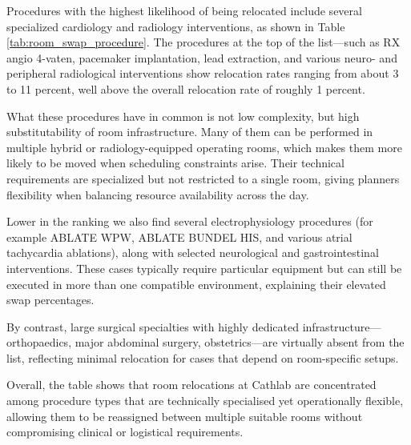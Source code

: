 \documentclass[
]{article}
\begin{document}
Procedures with the highest likelihood of being relocated include
several specialized cardiology and radiology interventions, as shown in
Table \ref{tab:room_swap_procedure}. The procedures at the top of the
list---such as RX angio 4-vaten, pacemaker implantation, lead
extraction, and various neuro- and peripheral radiological interventions
show relocation rates ranging from about 3 to 11 percent, well above the
overall relocation rate of roughly 1 percent.

What these procedures have in common is not low complexity, but high
substitutability of room infrastructure. Many of them can be performed
in multiple hybrid or radiology-equipped operating rooms, which makes
them more likely to be moved when scheduling constraints arise. Their
technical requirements are specialized but not restricted to a single
room, giving planners flexibility when balancing resource availability
across the day.

Lower in the ranking we also find several electrophysiology procedures
(for example ABLATE WPW, ABLATE BUNDEL HIS, and various atrial
tachycardia ablations), along with selected neurological and
gastrointestinal interventions. These cases typically require particular
equipment but can still be executed in more than one compatible
environment, explaining their elevated swap percentages.

By contrast, large surgical specialties with highly dedicated
infrastructure---orthopaedics, major abdominal surgery, obstetrics---are
virtually absent from the list, reflecting minimal relocation for cases
that depend on room-specific setups.

Overall, the table shows that room relocations at Cathlab are
concentrated among procedure types that are technically specialised yet
operationally flexible, allowing them to be reassigned between multiple
suitable rooms without compromising clinical or logistical requirements.
\end{document}
